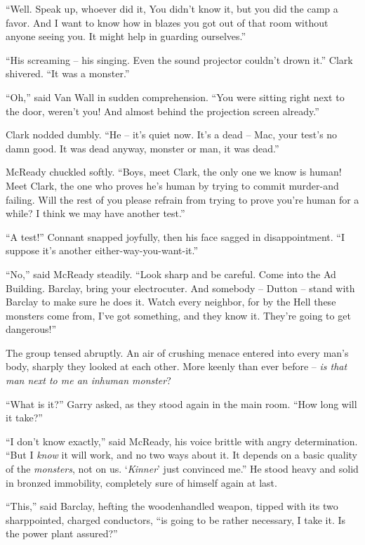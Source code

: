 \documentclass[letterpaper,openany,12pt]{memoir}		%
\begin{document}
``Well. Speak up, whoever did it, You didn't know it, but you did the camp a
favor. And I want to know how in blazes you got out of that room without anyone
seeing you. It might help in guarding ourselves.''

``His screaming -- his singing. Even the sound projector couldn't drown it.''
Clark shivered. ``It was a monster.''

``Oh,'' said Van Wall in sudden comprehension. ``You were sitting right next to
the door, weren't you! And almost behind the projection screen already.''

Clark nodded dumbly. ``He -- it's quiet now. It's a dead -- Mac, your test's no
damn good. It was dead anyway, monster or man, it was dead.''

McReady chuckled softly. ``Boys, meet Clark, the only one we know is human! Meet
Clark, the one who proves he's human by trying to commit murder-and failing.
Will the rest of you please refrain from trying to prove you're human for a
while? I think we may have another test.''

``A test!'' Connant snapped joyfully, then his face sagged in disappointment.
``I suppose it's another either-way-you-want-it.''

``No,'' said McReady steadily. ``Look sharp and be careful. Come into the Ad
Building. Barclay, bring your electrocuter. And somebody -- Dutton -- stand with
Barclay to make sure he does it. Watch every neighbor, for by the Hell these
monsters come from, I've got something, and they know it. They're going to get
dangerous!''

The group tensed abruptly. An air of crushing menace entered into every man's
body, sharply they looked at each other. More keenly than ever before --
\emph{is that man next to me an inhuman monster}?

``What is it?'' Garry asked, as they stood again in the main room. ``How long
will it take?''

``I don't know exactly,'' said McReady, his voice brittle with angry
determination. ``But I \emph{know} it will work, and no two ways about it. It
depends on a basic quality of the \emph{monsters}, not on us. `\emph{Kinner}'
just convinced me.'' He stood heavy and solid in bronzed immobility, completely
sure of himself again at last.

``This,'' said Barclay, hefting the woodenhandled weapon, tipped with its two
sharppointed, charged conductors, ``is going to be rather necessary, I take it.
Is the power plant assured?''
\end{document}
